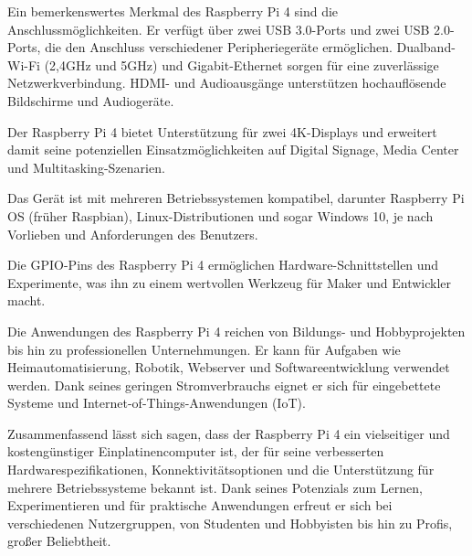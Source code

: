 Ein bemerkenswertes Merkmal des Raspberry Pi 4 sind die Anschlussmöglichkeiten. Er verfügt über zwei USB 3.0-Ports und zwei USB 2.0-Ports, die den Anschluss verschiedener Peripheriegeräte ermöglichen. Dualband-Wi-Fi (2,4GHz und 5GHz) und Gigabit-Ethernet sorgen für eine zuverlässige Netzwerkverbindung. HDMI- und Audioausgänge unterstützen hochauflösende Bildschirme und Audiogeräte.

Der Raspberry Pi 4 bietet Unterstützung für zwei 4K-Displays und erweitert damit seine potenziellen Einsatzmöglichkeiten auf Digital Signage, Media Center und Multitasking-Szenarien.

Das Gerät ist mit mehreren Betriebssystemen kompatibel, darunter Raspberry Pi OS (früher Raspbian), Linux-Distributionen und sogar Windows 10, je nach Vorlieben und Anforderungen des Benutzers.

Die GPIO-Pins des Raspberry Pi 4 ermöglichen Hardware-Schnittstellen und Experimente, was ihn zu einem wertvollen Werkzeug für Maker und Entwickler macht.

Die Anwendungen des Raspberry Pi 4 reichen von Bildungs- und Hobbyprojekten bis hin zu professionellen Unternehmungen. Er kann für Aufgaben wie Heimautomatisierung, Robotik, Webserver und Softwareentwicklung verwendet werden. Dank seines geringen Stromverbrauchs eignet er sich für eingebettete Systeme und Internet-of-Things-Anwendungen (IoT).

Zusammenfassend lässt sich sagen, dass der Raspberry Pi 4 ein vielseitiger und kostengünstiger Einplatinencomputer ist, der für seine verbesserten Hardwarespezifikationen, Konnektivitätsoptionen und die Unterstützung für mehrere Betriebssysteme bekannt ist. Dank seines Potenzials zum Lernen, Experimentieren und für praktische Anwendungen erfreut er sich bei verschiedenen Nutzergruppen, von Studenten und Hobbyisten bis hin zu Profis, großer Beliebtheit.